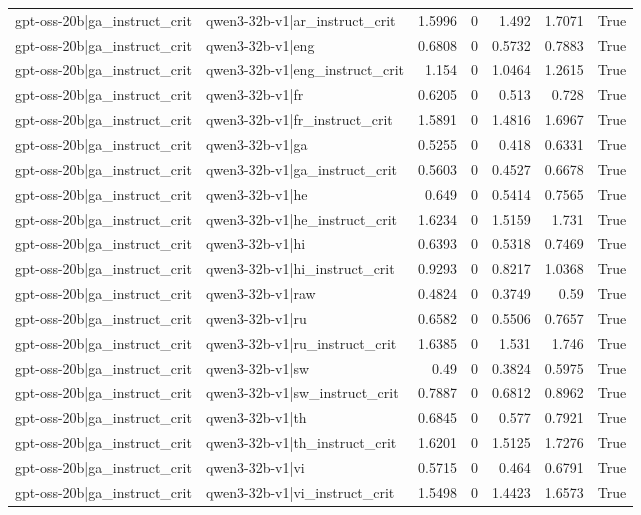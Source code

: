 \begin{table}
\begin{tabular}{l l r r r r l}
gpt-oss-20b|ga_instruct_crit & qwen3-32b-v1|ar_instruct_crit & 1.5996 & 0 & 1.492 & 1.7071 & True \\
gpt-oss-20b|ga_instruct_crit & qwen3-32b-v1|eng & 0.6808 & 0 & 0.5732 & 0.7883 & True \\
gpt-oss-20b|ga_instruct_crit & qwen3-32b-v1|eng_instruct_crit & 1.154 & 0 & 1.0464 & 1.2615 & True \\
gpt-oss-20b|ga_instruct_crit & qwen3-32b-v1|fr & 0.6205 & 0 & 0.513 & 0.728 & True \\
gpt-oss-20b|ga_instruct_crit & qwen3-32b-v1|fr_instruct_crit & 1.5891 & 0 & 1.4816 & 1.6967 & True \\
gpt-oss-20b|ga_instruct_crit & qwen3-32b-v1|ga & 0.5255 & 0 & 0.418 & 0.6331 & True \\
gpt-oss-20b|ga_instruct_crit & qwen3-32b-v1|ga_instruct_crit & 0.5603 & 0 & 0.4527 & 0.6678 & True \\
gpt-oss-20b|ga_instruct_crit & qwen3-32b-v1|he & 0.649 & 0 & 0.5414 & 0.7565 & True \\
gpt-oss-20b|ga_instruct_crit & qwen3-32b-v1|he_instruct_crit & 1.6234 & 0 & 1.5159 & 1.731 & True \\
gpt-oss-20b|ga_instruct_crit & qwen3-32b-v1|hi & 0.6393 & 0 & 0.5318 & 0.7469 & True \\
gpt-oss-20b|ga_instruct_crit & qwen3-32b-v1|hi_instruct_crit & 0.9293 & 0 & 0.8217 & 1.0368 & True \\
gpt-oss-20b|ga_instruct_crit & qwen3-32b-v1|raw & 0.4824 & 0 & 0.3749 & 0.59 & True \\
gpt-oss-20b|ga_instruct_crit & qwen3-32b-v1|ru & 0.6582 & 0 & 0.5506 & 0.7657 & True \\
gpt-oss-20b|ga_instruct_crit & qwen3-32b-v1|ru_instruct_crit & 1.6385 & 0 & 1.531 & 1.746 & True \\
gpt-oss-20b|ga_instruct_crit & qwen3-32b-v1|sw & 0.49 & 0 & 0.3824 & 0.5975 & True \\
gpt-oss-20b|ga_instruct_crit & qwen3-32b-v1|sw_instruct_crit & 0.7887 & 0 & 0.6812 & 0.8962 & True \\
gpt-oss-20b|ga_instruct_crit & qwen3-32b-v1|th & 0.6845 & 0 & 0.577 & 0.7921 & True \\
gpt-oss-20b|ga_instruct_crit & qwen3-32b-v1|th_instruct_crit & 1.6201 & 0 & 1.5125 & 1.7276 & True \\
gpt-oss-20b|ga_instruct_crit & qwen3-32b-v1|vi & 0.5715 & 0 & 0.464 & 0.6791 & True \\
gpt-oss-20b|ga_instruct_crit & qwen3-32b-v1|vi_instruct_crit & 1.5498 & 0 & 1.4423 & 1.6573 & True \\

\end{tabular}
\end{table}
